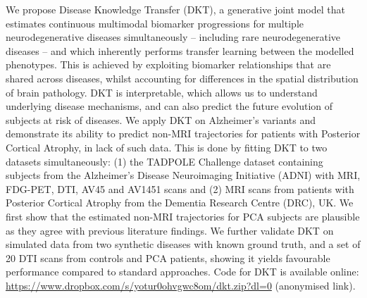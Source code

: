 \documentclass{llncs}
\begin{document}
We propose Disease Knowledge Transfer (DKT), a generative joint model that estimates continuous multimodal biomarker progressions for multiple neurodegenerative diseases simultaneously -- including rare neurodegenerative diseases -- and which inherently performs transfer learning between the modelled phenotypes. This is achieved by exploiting biomarker relationships that are shared across diseases, whilst accounting for differences in the spatial distribution of brain pathology. DKT is interpretable, which allows us to understand underlying disease mechanisms, and can also predict the future evolution of subjects at risk of diseases. We apply DKT on Alzheimer's variants and demonstrate its ability to predict non-MRI trajectories for patients with Posterior Cortical Atrophy, in lack of such data. This is done by fitting DKT to two datasets simultaneously: (1) the TADPOLE Challenge \cite{marinescu2018tadpole} dataset containing subjects from the Alzheimer's Disease Neuroimaging Initiative (ADNI) with MRI, FDG-PET, DTI, AV45 and AV1451 scans and (2) MRI scans from patients with Posterior Cortical Atrophy from the Dementia Research Centre (DRC), UK. We first show that the estimated non-MRI trajectories for PCA subjects are plausible as they agree with previous literature findings. We further validate DKT on simulated data from two synthetic diseases with known ground truth, and a set of 20 DTI scans from controls and PCA patients, showing it yields favourable performance compared to standard approaches. Code for DKT is available online: \url{https://www.dropbox.com/s/yotur0ohvgwc8om/dkt.zip?dl=0} (anonymised link).
\end{document}
